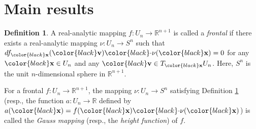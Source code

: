 \documentclass{amsart}
\theoremstyle{definition}
\newtheorem{definition}{Definition}
\theoremstyle{definition}
\theoremstyle{definition}
\begin{document}
\section{Main results}\label{section2}
\begin{definition}\label{frontal}
{\rm
A {\color{black}real-analytic} mapping $f: U_n\to \mathbb{R}^{n+1}$ is called 
a \textit{frontal} if there exists a real-analytic mapping 
$\nu: U_n\to S^n$ such that 
$df_{\color{black}\bf x}({\color{black}\bf v}){\color{black}\cdot} 
\nu({\color{black}\bf x})=0$ for any 
${\color{black}\bf x}\in U_n$ and any ${\color{black}\bf v}\in 
T_{\color{black}\bf x}U_n$.    
Here, $S^n$ is the unit $n$-dimensional sphere 
{\color{black}in $\mathbb{R}^{n+1}$}.  
}
\end{definition}
\noindent 
For a frontal $f: U_n\to \mathbb{R}^{n+1}$, the mapping 
$\nu: U_n\to S^n$ satisfying Definition \ref{frontal} 
(resp., the function $a: U_n\to \mathbb{R}$ defined by  
$a({\color{black}\bf x})=f({\color{black}\bf x}) 
{\color{black}\cdot} \nu({\color{black}\bf x})$)  
is called the \textit{Gauss mapping} (resp., the \textit{height function}) 
of $f$.    
\end{document}
